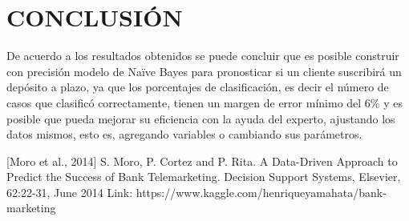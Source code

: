 \documentclass[letterpaper, 10 pt, conference]{ieeeconf}
\begin{document}
\section{CONCLUSIÓN}

De acuerdo a los resultados obtenidos se puede concluir que es posible construir con precisión modelo de Naïve Bayes para pronosticar si un cliente suscribirá un depósito a plazo, ya que los porcentajes de clasificación, es decir el número de casos que clasificó correctamente, tienen un margen de error mínimo del 6\% y es posible que pueda mejorar su eficiencia con la ayuda del experto, ajustando los datos mismos, esto es, agregando variables o cambiando sus parámetros.\\

\begin{thebibliography}{}

 [Moro et al., 2014] S. Moro, P. Cortez and P. Rita. A Data-Driven Approach to Predict the Success of Bank Telemarketing. Decision Support Systems, Elsevier, 62:22-31, June 2014 Link: https://www.kaggle.com/henriqueyamahata/bank-marketing\\
\end{thebibliography}{}
\end{document}
